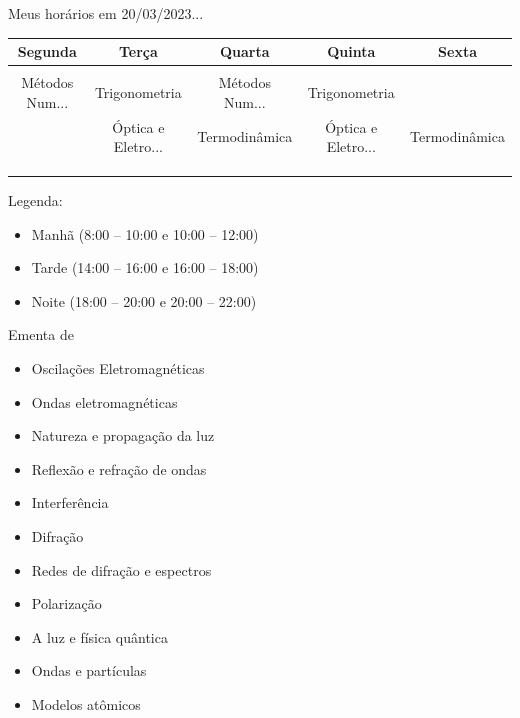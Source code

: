\begin{frame}{Meus horários em 20/03/2023...}
    \small{
        \begin{center}
            \begin{tabular}{ccccc}
                \rowcolor{black!10} Segunda & Terça & Quarta & Quinta & Sexta \\ \hline
                \rowcolor{red!25} &&&& \\ \hline
                \rowcolor{red!25} Métodos Num... & Trigonometria & Métodos Num... & Trigonometria & \\ \hline
                \rowcolor{green!25} & Óptica e Eletro... & Termodinâmica & Óptica e Eletro... & Termodinâmica \\ \hline
                \rowcolor{green!25} &&&& \\ \hline
                \rowcolor{blue!25} &&&& \\ \hline
                \rowcolor{blue!25} &&&& \\ \hline
            \end{tabular}
        \end{center}

        \vspace{1cm}
        Legenda:
        \begin{itemize}
            \item[\textcolor{red!25}{\rule{1em}{1em}}] Manhã (8:00 -- 10:00 e 10:00 -- 12:00)
            \item[\textcolor{green!25}{\rule{1em}{1em}}] Tarde (14:00 -- 16:00 e 16:00 -- 18:00)
            \item[\textcolor{blue!25}{\rule{1em}{1em}}] Noite (18:00 -- 20:00 e 20:00 -- 22:00)
        \end{itemize}
    }
\end{frame}

\begin{frame}{Ementa de \Disciplina}
    \begin{itemize}
        \item Oscilações Eletromagnéticas
        \item Ondas eletromagnéticas
        \item Natureza e propagação da luz
        \item Reflexão e refração de ondas
        \item Interferência
        \item Difração
        \item Redes de difração e espectros
        \item Polarização
        \item A luz e física quântica
        \item Ondas e partículas
        \item Modelos atômicos
    \end{itemize}
\end{frame}


